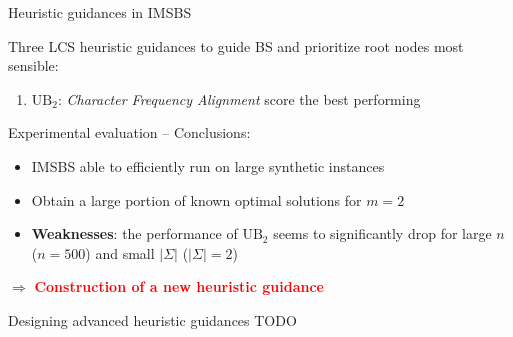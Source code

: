 \documentclass{beamer}
\begin{document}
\begin{frame}{Heuristic guidances in IMSBS}
    
    Three LCS heuristic guidances to guide BS and prioritize root nodes most sensible: \vspace{0.2cm}
        \begin{enumerate}
    	  	\item   $\textrm{UB}_2$: \textit{Character Frequency Alignment} score the best performing
    \end{enumerate}
    
    Experimental evaluation -- Conclusions:
    \begin{itemize}
    	\item IMSBS able to efficiently run on large synthetic instances
    	\item Obtain a large portion  of known optimal solutions for $m=2$
    	\item \textbf{Weaknesses}: the performance of $\textrm{UB}_2$ seems to significantly drop for  large $n$ ($n=500$) and small $|\Sigma|$ ($|\Sigma|=2$)
    \end{itemize} \vspace{0.7cm}
    $\Rightarrow$ \textcolor{red}{\textbf{Construction of a new heuristic guidance}}
\end{frame}


\begin{frame}{Designing advanced heuristic guidances }
TODO
\end{frame}

 
\end{document}
